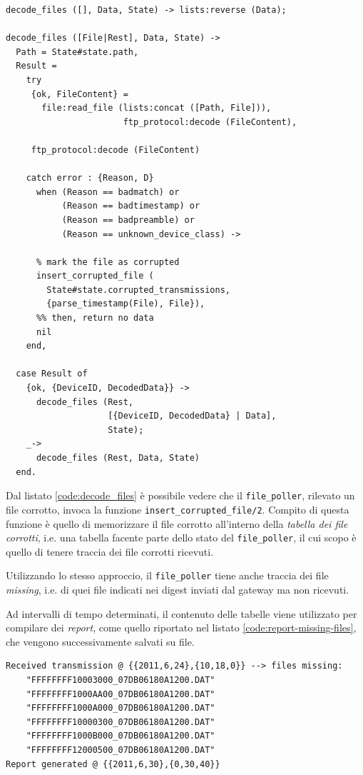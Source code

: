 %
\begin{lstlisting}[caption={Decodifica dei dati}, label={code:decode_files},frame=trBL]
decode_files ([], Data, State) -> lists:reverse (Data);

decode_files ([File|Rest], Data, State) ->
  Path = State#state.path,
  Result = 
    try
     {ok, FileContent} = 
       file:read_file (lists:concat ([Path, File])),
                       ftp_protocol:decode (FileContent),

     ftp_protocol:decode (FileContent)
		
    catch error : {Reason, D} 
      when (Reason == badmatch) or 
           (Reason == badtimestamp) or
           (Reason == badpreamble) or 
           (Reason == unknown_device_class) -> 
		
      % mark the file as corrupted
      insert_corrupted_file (
        State#state.corrupted_transmissions,
    	{parse_timestamp(File), File}), 
      %% then, return no data
      nil
    end,
    
  case Result of 
    {ok, {DeviceID, DecodedData}} ->
      decode_files (Rest, 
                    [{DeviceID, DecodedData} | Data], 
                    State);
    _->
      decode_files (Rest, Data, State)
  end.
\end{lstlisting}
%

%
Dal listato \ref{code:decode_files} \`e possibile vedere che il \texttt{file\_poller}, rilevato
un file corrotto, invoca la funzione \texttt{insert\_corrupted\_file/2}. Compito di questa funzione 
\`e quello di memorizzare il file corrotto all'interno della \emph{tabella dei file corrotti}, 
i.e. una tabella facente parte dello stato del \texttt{file\_poller}, il cui scopo \`e quello
di tenere traccia dei file corrotti ricevuti.
%

%
Utilizzando lo stesso approccio, il \texttt{file\_poller} tiene anche traccia dei file \emph{missing}, 
i.e. di quei file indicati nei digest inviati dal gateway ma non ricevuti.
%

%
Ad intervalli di tempo determinati, il contenuto delle tabelle viene utilizzato per compilare dei 
\emph{report}, come quello riportato nel listato \ref{code:report-missing-files}, che vengono 
successivamente salvati su file.
%
\begin{lstlisting}[caption={Esempio di report per dati mancanti}, label={code:report-missing-files},frame=trBL]
Received transmission @ {{2011,6,24},{10,18,0}} --> files missing:
    "FFFFFFFF10003000_07DB06180A1200.DAT"
    "FFFFFFFF1000AA00_07DB06180A1200.DAT"
    "FFFFFFFF1000A000_07DB06180A1200.DAT"
    "FFFFFFFF10000300_07DB06180A1200.DAT"
    "FFFFFFFF1000B000_07DB06180A1200.DAT"
    "FFFFFFFF12000500_07DB06180A1200.DAT"
Report generated @ {{2011,6,30},{0,30,40}}
\end{lstlisting}
%

